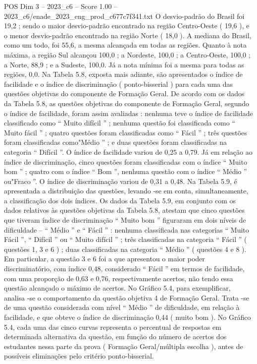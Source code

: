 \begin{textsample}{POS Dim 3 – 2023\_c6 – Score 1.00 – 2023\_c6/enade\_2023\_eng\_prod\_c677c7f341.txt}
O desvio-padrão do Brasil foi 19,2 ; sendo o maior desvio-padrão encontrado na região Centro-Oeste ( 19,6 ), e o menor desvio-padrão encontrado na região Norte ( 18,0 ).
A mediana do Brasil, como um todo, foi 55,6, a mesma alcançada em todas as regiões.
Quanto à nota máxima, a região Sul alcançou 100,0 ; a Nordeste, 100,0 ; a Centro-Oeste, 100,0 ; a Norte, 88,9 ; e a Sudeste, 100,0.
Já a nota mínima foi a mesma para todas as regiões, 0,0.
Na Tabela 5.8, exposta mais adiante, são apresentados o índice de facilidade e o índice de discriminação ( ponto-bisserial ) para cada uma das questões objetivas do componente de Formação Geral.
De acordo com os dados da Tabela 5.8, as questões objetivas do componente de Formação Geral, segundo o índice de facilidade, foram assim avaliadas : nenhuma teve o índice de facilidade classificado como “ Muito difícil ” ; nenhuma questão foi classificada como “ Muito fácil ” ; quatro questões foram classificadas como “ Fácil ” ; três questões foram classificadas como"Médio ” ; e duas questões foram classificadas na categoria “ Difícil ”.
O índice de facilidade variou de 0,25 a 0,79.
Já em relação ao índice de discriminação, cinco questões foram classificadas com o índice “ Muito bom ” ; quatro com o índice “ Bom ”, nenhuma questão com o índice “ Médio ” ou"Fraco ”.
O índice de discriminação variou de 0,31 a 0,48.
Na Tabela 5.9, é apresentada a distribuição das questões, levando -se em conta, simultaneamente, a classificação dos dois índices.
Os dados da Tabela 5.9, em conjunto com os dados relativos às questões objetivas da Tabela 5.8, atestam que cinco questões que tiveram índice de discriminação “ Muito bom ” figuraram em dois níveis de dificuldade – “ Médio ” e “ Fácil ” : nenhuma classificada nas categorias “ Muito Fácil ”, “ Difícil ” ou “ Muito difícil ” ; três classificadas na categoria “ Fácil ” ( questões 1, 3 e 6 ) ; duas classificadas na categoria “ Médio ” ( questões 4 e 8 ).
Em particular, a questão 3 e 6 foi a que apresentou o maior poder discriminatório, com índice 0,48, considerado “ Fácil ” em termos de facilidade, com uma proporção de 0,63 e 0,76, respectivamente acertos, não tendo essa questão alcançado o máximo de acertos.
No Gráfico 5.4, para exemplificar, analisa -se o comportamento da questão objetiva 4 de Formação Geral.
Trata -se de uma questão considerada com nível “ Médio ” de dificuldade, em relação à facilidade, e que obteve o índice de discriminação 0,44 ( muito bom ).
No Gráfico 5.4, cada uma das cinco curvas representa o percentual de respostas em determinada alternativa da questão, em função do número de acertos dos estudantes nessa parte da prova ( Formação Geral/múltipla escolha ), antes de possíveis eliminações pelo critério ponto-bisserial.

\end{textsample}
